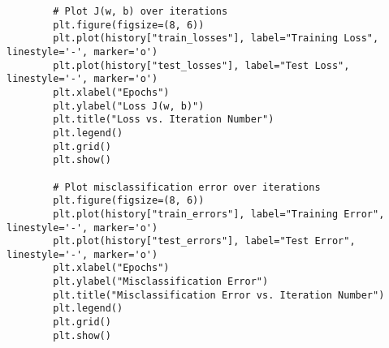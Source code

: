 \documentclass{article}
\begin{document}
\begin{lstlisting}
        # Plot J(w, b) over iterations
        plt.figure(figsize=(8, 6))
        plt.plot(history["train_losses"], label="Training Loss", linestyle='-', marker='o')
        plt.plot(history["test_losses"], label="Test Loss", linestyle='-', marker='o')
        plt.xlabel("Epochs")
        plt.ylabel("Loss J(w, b)")
        plt.title("Loss vs. Iteration Number")
        plt.legend()
        plt.grid()
        plt.show()
    
        # Plot misclassification error over iterations
        plt.figure(figsize=(8, 6))
        plt.plot(history["train_errors"], label="Training Error", linestyle='-', marker='o')
        plt.plot(history["test_errors"], label="Test Error", linestyle='-', marker='o')
        plt.xlabel("Epochs")
        plt.ylabel("Misclassification Error")
        plt.title("Misclassification Error vs. Iteration Number")
        plt.legend()
        plt.grid()
        plt.show()
    
\end{lstlisting}
\end{document}
